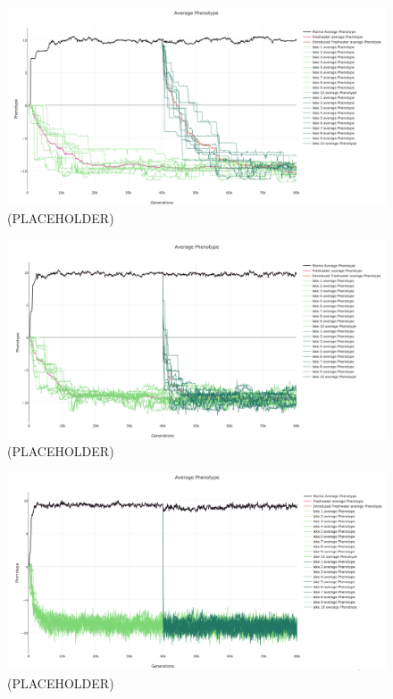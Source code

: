 \documentclass{article}
\begin{document}
\begin{figure}[h!tb]
	\begin{center}
  		\includegraphics[width=0.7\linewidth]{plotlyPlots/PhenotypeThroughout5e-5.png}
  		\caption{ (PLACEHOLDER)
		}
  		\label{fig:Haplo1}
	\end{center}
\end{figure}

\begin{figure}[h!tb]
	\begin{center}
  		\includegraphics[width=0.7\linewidth]{plotlyPlots/PhenotypeThroughout5e-4.png}
  		\caption{(PLACEHOLDER)
		}
  		\label{fig:Haplo2}
	\end{center}
\end{figure}

\begin{figure}[h!tb]
	\begin{center}
  		\includegraphics[width=0.7\linewidth]{plotlyPlots/PhenotypeThroughout5e-3.png}
  		\caption{(PLACEHOLDER)
		}
  		\label{fig:Haplo3}
	\end{center}
\end{figure}
\end{document}
